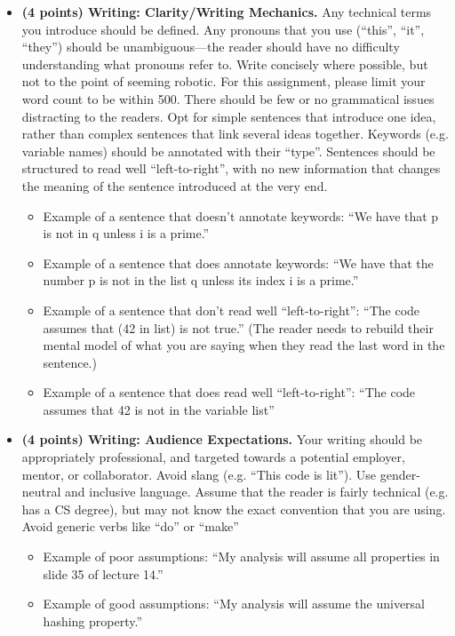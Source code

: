 \documentclass{article}
\begin{document}
\begin{itemize}
use complete sentences, though you could also use bullets, tables and figures to highlight important information. An
observation should be presented before the analysis that relies on that observation is presented.
\item {\bf (4 points) Writing: Clarity/Writing Mechanics.} Any technical terms you introduce should be defined. Any pronouns
that you use (“this”, “it”, “they”) should be unambiguous—the reader should have no difficulty understanding what
pronouns refer to. Write concisely where possible, but not to the point of seeming robotic. For this assignment, please
limit your word count to be within 500. There should be few or no grammatical issues distracting to the readers. Opt
for simple sentences that introduce one idea, rather than complex sentences that link several ideas together. Keywords
(e.g. variable names) should be annotated with their “type”. Sentences should be structured to read well “left-to-right”,
with no new information that changes the meaning of the sentence introduced at the very end.
\begin{itemize}
\item Example of a sentence that doesn’t annotate keywords: “We have that p is not in q unless i is a prime.”
\item Example of a sentence that does annotate keywords: “We have that the number p is not in the list q unless its
index i is a prime.”
\item Example of a sentence that don’t read well “left-to-right”: “The code assumes that (42 in list) is not true.”
(The reader needs to rebuild their mental model of what you are saying when they read the last word in the
sentence.)
\item Example of a sentence that does read well “left-to-right”: “The code assumes that 42 is not in the variable list”
\end{itemize}
\item {\bf (4 points) Writing: Audience Expectations.} Your writing should be appropriately professional, and targeted towards a
potential employer, mentor, or collaborator. Avoid slang (e.g. “This code is lit”). 
 Use gender-neutral and inclusive
language. Assume that the reader is fairly technical (e.g. has a CS degree), but may not know the exact convention
that you are using. Avoid generic verbs like “do” or “make”
\begin{itemize}
\item Example of poor assumptions: “My analysis will assume all properties in slide 35 of lecture 14.”
\item Example of good assumptions: “My analysis will assume the universal hashing property.”

\end{itemize}
\end{itemize}
\end{document}
